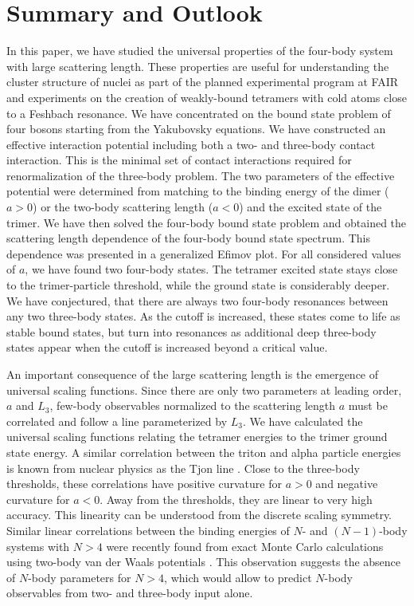 \documentclass[prc,preprint,showpacs,tightenlines,%
nofootinbib]{revtex4}
\begin{document}
\section{Summary and Outlook}
\label{sec:conc}
%
In this paper, we have studied the universal
properties of the four-body system with large scattering length. 
These properties are useful for understanding the cluster structure 
of nuclei \cite{Mar06} as part of the planned experimental program at FAIR
and experiments on the creation of weakly-bound tetramers with cold atoms
close to a Feshbach resonance.
We have concentrated on the bound state problem of four bosons 
starting from the Yakubovsky equations.
We have constructed an effective interaction potential including 
both a two- and three-body contact interaction.
This is the minimal set of contact interactions required for 
renormalization of the three-body problem.
The two parameters of the effective potential were determined from
matching to the binding energy of the dimer ($a>0$) or 
the two-body scattering length ($a<0$) and the excited state
of the trimer. We have then solved the four-body bound state problem
and obtained the scattering length dependence of the four-body 
bound state spectrum. This dependence was presented in a generalized
Efimov plot. For all considered values of $a$, 
we have found two four-body states. 
The tetramer excited state stays close to the trimer-particle threshold,
while the ground state is considerably deeper.
We have conjectured, that there are always two four-body resonances
between any two three-body states. As the cutoff is increased, these
states come to life as stable bound states, but turn into resonances
as additional deep three-body states appear when the cutoff is increased
beyond a critical value.


An important consequence of the large scattering length is the 
emergence of universal scaling functions. Since there are only two 
parameters at leading order, $a$ and $L_3$, few-body observables
normalized to the scattering length $a$ must be correlated and follow
a line parameterized by $L_3$.
We have calculated the universal scaling functions relating 
the tetramer energies to the trimer ground state energy. A
similar correlation between the triton and alpha particle 
energies is known from nuclear physics as the Tjon line 
\cite{Tjo75,Platter:2004zs,Nogga:2004ab}.
Close to the three-body thresholds, these correlations have 
positive curvature for $a>0$ and negative curvature for $a<0$.
Away from the thresholds, they are linear
to very high accuracy. This linearity can be understood from the
discrete scaling symmetry. Similar linear correlations between the 
binding energies of $N$- and $(N-1)$-body systems with $N>4$ were 
recently found from exact Monte Carlo calculations using 
two-body van der Waals potentials \cite{Hanna06}. 
This observation suggests the absence of $N$-body parameters for $N>4$,
which would allow to predict $N$-body observables from two- and
three-body input alone.
\end{document}
